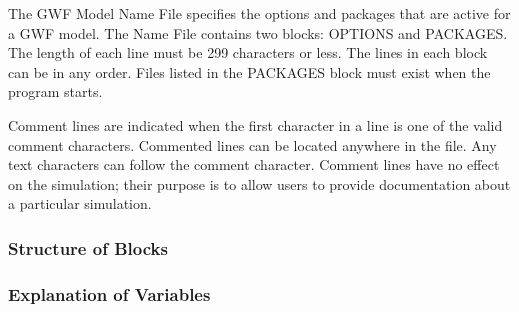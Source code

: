 The GWF Model Name File specifies the options and packages that are active for a GWF model.  The Name File contains two blocks: OPTIONS  and PACKAGES. The length of each line must be 299 characters or less. The lines in each block can be in any order.  Files listed in the PACKAGES block must exist when the program starts. 

Comment lines are indicated when the first character in a line is one of the valid comment characters.  Commented lines can be located anywhere in the file. Any text characters can follow the comment character. Comment lines have no effect on the simulation; their purpose is to allow users to provide documentation about a particular simulation. 

\vspace{5mm}
\subsubsection{Structure of Blocks}



\vspace{5mm}
\subsubsection{Explanation of Variables}
\begin{description}

\end{description}

